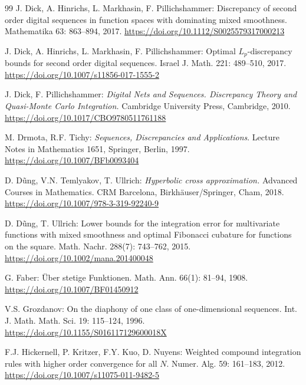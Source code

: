 \documentclass[12pt, a4paper]{article}
\begin{document}
\begin{thebibliography}{99}
 J. Dick, A. Hinrichs, L. Markhasin, F. Pillichshammer: Discrepancy of second order digital sequences in function spaces with dominating mixed smoothness. Mathematika 63: 863--894, 2017. \href{https://doi.org/10.1112/S0025579317000213}{https://doi.org/10.1112/S0025579317000213}

 J. Dick, A. Hinrichs, L. Markhasin, F. Pillichshammer: Optimal $L_p$-discrepancy bounds for second order digital sequences. Israel J. Math. 221: 489--510, 2017. \href{https://doi.org/10.1007/s11856-017-1555-2}{https://doi.org/10.1007/s11856-017-1555-2}

 J. Dick, F. Pillichshammer: {\it Digital Nets and Sequences. Discrepancy Theory and Quasi-Monte Carlo Integration.} Cambridge University Press, Cambridge, 2010. \href{https://doi.org/10.1017/CBO9780511761188}{https://doi.org/10.1017/CBO9780511761188}

 M. Drmota, R.F. Tichy: {\it Sequences, Discrepancies and Applications}. Lecture Notes in Mathematics 1651, Springer, Berlin, 1997. \href{https://doi.org/10.1007/BFb0093404}{https://doi.org/10.1007/BFb0093404}

 D. D\~ung, V.N. Temlyakov, T. Ullrich: {\it Hyperbolic cross approximation.} Advanced Courses in Mathematics. CRM Barcelona, Birkh\"auser/Springer, Cham, 2018. \href{https://doi.org/10.1007/978-3-319-92240-9}{https://doi.org/10.1007/978-3-319-92240-9}

 D. D\~ung, T. Ullrich: Lower bounds for the integration error for multivariate functions with mixed smoothness and optimal Fibonacci cubature for functions on the square. Math. Nachr. 288(7): 743--762, 2015. \href{https://doi.org/10.1002/mana.201400048}{https://doi.org/10.1002/mana.201400048}

 G. Faber: \"Uber stetige Funktionen. Math. Ann. 66(1): 81--94, 1908. \href{https://doi.org/10.1007/BF01450912}{https://doi.org/10.1007/BF01450912}

 V.S. Grozdanov: On the diaphony of one class of one-dimensional sequences. Int. J. Math. Math. Sci. 19: 115--124, 1996. \href{https://doi.org/10.1155/S016117129600018X}{https://doi.org/10.1155/S016117129600018X}


 F.J. Hickernell, P. Kritzer, F.Y. Kuo, D. Nuyens: Weighted compound integration rules with higher order convergence for all $N$. Numer. Alg. 59: 161--183, 2012. \href{https://doi.org/10.1007/s11075-011-9482-5}{https://doi.org/10.1007/s11075-011-9482-5}


\end{thebibliography}
\end{document}
